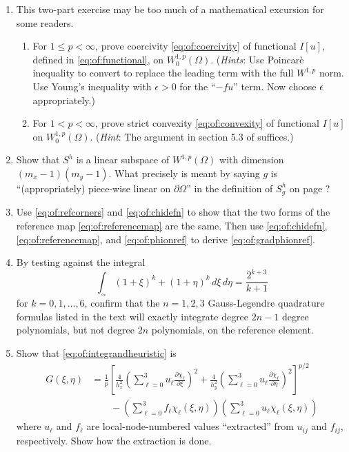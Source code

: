 \renewcommand{\labelenumi}{\arabic{chapter}.\arabic{enumi}\quad}
\renewcommand{\labelenumii}{(\alph{enumii})}
\begin{enumerate}
\item  \label{exer:of:twoproperties}  This two-part exercise may be too much of a mathematical excursion for some readers.
  \begin{enumerate}
  \item For $1 \le p < \infty$, prove coercivity \eqref{eq:of:coercivity} of functional $I[u]$, defined in \eqref{eq:of:functional}, on $W_0^{1,p}(\Omega)$.  (\emph{Hints}:  Use Poincar\`e inequality \citep[Theorem 6.30]{AdamsFournier2003} to convert to replace the leading term with the full $W^{1,p}$ norm.  Use Young's inequality with $\epsilon>0$ \citep[Appendix B]{Evans2010} for the ``$-fu$'' term.  Now choose $\epsilon$ appropriately.)
  \item For $1 < p < \infty$, prove strict convexity \eqref{eq:of:convexity} of functional $I[u]$ on $W_0^{1,p}(\Omega)$.  (\emph{Hint}:  The argument in section 5.3 of \citet{Ciarlet2002} suffices.)
  \end{enumerate}

\item Show that $S^h$ is a linear subspace of $W^{1,p}(\Omega)$ with dimension $(m_x-1)(m_y-1)$.  What precisely is meant by saying $g$ is ``(appropriately) piece-wise linear on $\partial\Omega$'' in the definition of $S_g^h$ on page \pageref{eq:of:Sghdefn}?

\item  Use \eqref{eq:of:refcorners} and \eqref{eq:of:chidefn} to show that the two forms of the reference map \eqref{eq:of:referencemap} are the same.  Then use \eqref{eq:of:chidefn}, \eqref{eq:of:referencemap}, and \eqref{eq:of:phionref} to derive \eqref{eq:of:gradphionref}.

\item By testing against the integral
    $$\int_{\square_\ast} (1+\xi)^k + (1+\eta)^k\,d\xi\, d\eta = \frac{2^{k+3}}{k+1}$$
for $k=0,1,\dots,6$, confirm that the $n=1,2,3$ Gauss-Legendre quadrature formulas listed in the text will exactly integrate degree $2n-1$ degree polynomials, but not degree $2n$ polynomials, on the reference element.

\item \label{exer:of:integrand}  Show that \eqref{eq:of:integrandheuristic} is
\begin{align*}
G(\xi,\eta) &= \frac{1}{p} \left[\frac{4}{h_x^2} \left(\sum_{\ell=0}^3 u_\ell \frac{\partial\chi_\ell}{\partial \xi}\right)^2 + \frac{4}{h_y^2} \left(\sum_{\ell=0}^3 u_\ell \frac{\partial\chi_\ell}{\partial \eta}\right)^2\right]^{p/2} \\
  &\qquad - \left(\sum_{\ell=0}^3 f_\ell \chi_\ell(\xi,\eta)\right) \left(\sum_{\ell=0}^3 u_\ell \chi_\ell(\xi,\eta)\right)
\end{align*}
where $u_\ell$ and $f_\ell$ are local-node-numbered values ``extracted'' from $u_{ij}$ and $f_{ij}$, respectively.  Show how the extraction is done.


\end{enumerate}
